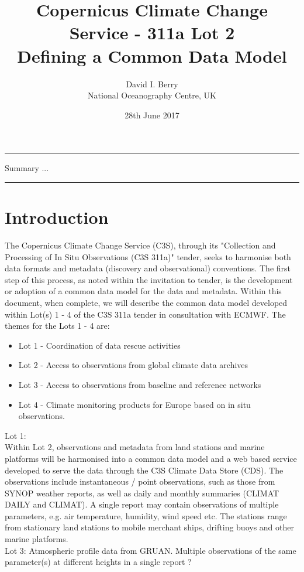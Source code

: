 \documentclass[a4paper]{article}
\title {Copernicus Climate Change Service - 311a Lot 2 \\ Defining a Common Data Model}
\author {David I. Berry \\ National Oceanography Centre, UK}
\date {28th June 2017}
\begin{document}
\maketitle

\vskip 0.5in
\hrule
Summary ...
\vskip 2in
\hrule

\newpage
\tableofcontents
\newpage
\listoftables
\newpage


\section {Introduction}

The Copernicus Climate Change Service (C3S), through its "Collection and Processing of In Situ Observations (C3S 311a)" tender, seeks to harmonise both data formats and metadata (discovery and observational) conventions. The first step of this process, as noted within the invitation to tender, is the development or adoption of a common data model  for the data and metadata. Within this document, when complete, we will describe the common data model developed within Lot(s) 1 - 4 of the C3S 311a tender in consultation with ECMWF. The themes for the Lots 1 - 4 are:\\
\begin{itemize}
\item Lot 1 - Coordination of data rescue activities
\item Lot 2 - Access to observations from global climate data archives
\item Lot 3 - Access to observations from baseline and reference networks
\item Lot 4 - Climate monitoring products for Europe based on in situ observations.
\end{itemize}
Lot 1:\\

Within Lot 2, observations and metadata from land stations and marine platforms will be harmonised into a common data model and a web based service developed to serve the data through the C3S Climate Data Store (CDS). The observations include instantaneous / point observations, such as those from SYNOP weather reports, as well as daily and monthly summaries (CLIMAT DAILY and CLIMAT). A single report may contain observations of multiple parameters, e.g. air temperature, humidity, wind speed etc. The stations range from stationary land stations to mobile merchant ships, drifting buoys and other marine platforms.\\

Lot 3: Atmospheric profile data from GRUAN. Multiple observations of the same parameter(s) at different heights in a single report ? \\
\end{document}

